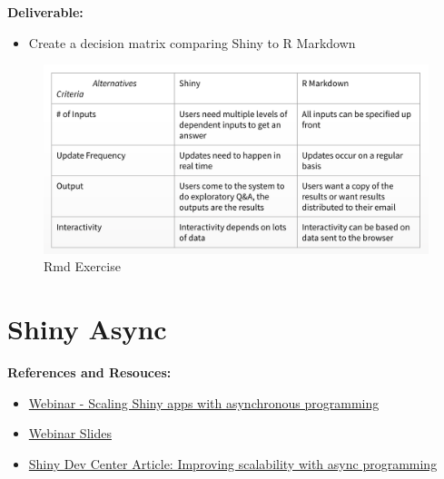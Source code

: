 \documentclass[]{book}
\providecommand{\tightlist}{%
  \setlength{\itemsep}{0pt}\setlength{\parskip}{0pt}}
\theoremstyle{definition}
\theoremstyle{definition}
\theoremstyle{definition}
\theoremstyle{remark}
\begin{document}
\textbf{Deliverable:}

\begin{itemize}
\tightlist
\item
  Create a decision matrix comparing Shiny to R Markdown
\end{itemize}

\begin{figure}
\centering
\includegraphics{imgs/shiny-alt/rmd-answers.png}
\caption{Rmd Exercise}
\end{figure}

\hypertarget{shiny-async}{%
\chapter{Shiny Async}\label{shiny-async}}

\textbf{References and Resouces:}

\begin{itemize}
\tightlist
\item
  \href{https://resources.rstudio.com/webinars/scaling-shiny-apps-with-async-programming-june-2018}{Webinar
  - Scaling Shiny apps with asynchronous programming}
\item
  \href{https://github.com/rstudio/webinars/blob/master/56-scaling-shiny-apps/Scaling\%20Shiny\%20apps\%20with\%20async\%20programming.pdf}{Webinar
  Slides}
\item
  \href{http://shiny.rstudio.com/articles/async.html}{Shiny Dev Center
  Article: Improving scalability with async programming}
\end{itemize}
\end{document}
